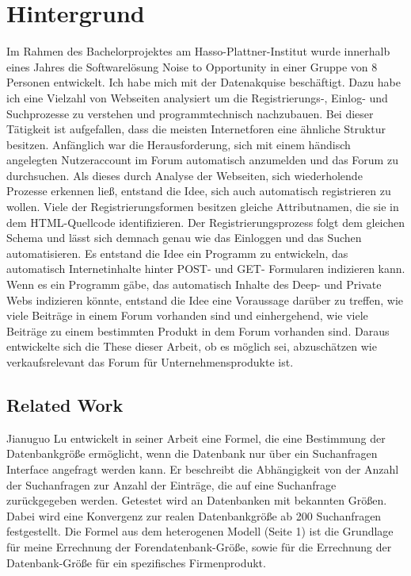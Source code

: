 \section{Hintergrund}

Im Rahmen des Bachelorprojektes am Hasso-Plattner-Institut wurde innerhalb eines Jahres die Softwarelösung Noise to Opportunity in einer Gruppe von 8 Personen entwickelt. Ich habe mich mit der Datenakquise beschäftigt. Dazu habe ich eine Vielzahl von Webseiten analysiert um die Registrierungs-, Einlog- und Suchprozesse zu verstehen und programmtechnisch nachzubauen. Bei dieser Tätigkeit ist aufgefallen, dass die meisten Internetforen eine ähnliche Struktur besitzen. Anfänglich war die Herausforderung, sich mit einem händisch angelegten Nutzeraccount im Forum automatisch anzumelden und das Forum zu durchsuchen. Als dieses durch Analyse der Webseiten, sich wiederholende Prozesse erkennen ließ, entstand die Idee, sich auch automatisch registrieren zu wollen.
Viele der Registrierungsformen besitzen gleiche Attributnamen, die sie in dem HTML-Quellcode identifizieren. Der Registrierungsprozess folgt dem gleichen Schema und lässt sich demnach genau wie das Einloggen und das Suchen automatisieren. Es entstand die Idee ein Programm zu entwickeln, das automatisch Internetinhalte hinter POST- und GET- Formularen indizieren kann. Wenn es ein Programm gäbe, das automatisch Inhalte des Deep- und Private Webs indizieren könnte, entstand die Idee eine Voraussage darüber zu treffen, wie viele Beiträge in einem Forum vorhanden sind und einhergehend, wie viele Beiträge zu einem bestimmten Produkt in dem Forum vorhanden sind.
Daraus entwickelte sich die These dieser Arbeit, ob es möglich sei, abzuschätzen wie verkaufsrelevant das Forum für Unternehmensprodukte ist.

\subsection{Related Work}

Jianuguo Lu \cite{lu2008efficient} entwickelt in seiner Arbeit eine Formel, die eine Bestimmung der Datenbankgröße ermöglicht, wenn die Datenbank nur über ein Suchanfragen Interface angefragt werden kann. Er beschreibt die Abhängigkeit von der Anzahl der Suchanfragen zur Anzahl der Einträge, die auf eine Suchanfrage zurückgegeben werden. Getestet wird an Datenbanken mit bekannten Größen. Dabei wird eine Konvergenz zur realen Datenbankgröße ab 200 Suchanfragen festgestellt. Die Formel aus dem heterogenen Modell (Seite 1) ist die Grundlage für meine Errechnung der Forendatenbank-Größe, sowie für die Errechnung der Datenbank-Größe für ein spezifisches Firmenprodukt.

